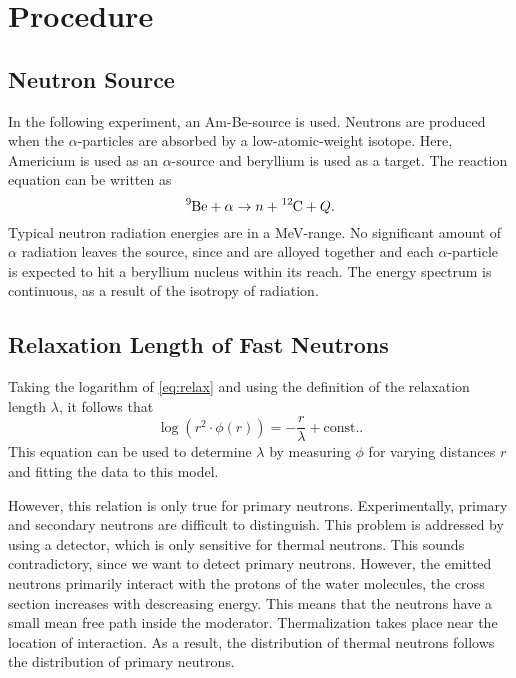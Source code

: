 \chapter{Procedure}\label{chap:explaining-shit}
\section{Neutron Source}
In the following experiment, an Am-Be-source is used.
Neutrons are produced when the $\alpha$-particles are absorbed by a low-atomic-weight isotope.
Here, Americium is used as an $\alpha$-source and beryllium is used as a target.
The reaction equation can be written as
\begin{equation*}
	\ce{^{9}Be} + \alpha \rightarrow n + \ce{^{12}C} + Q.
\end{equation*}
Typical neutron radiation energies are in a \si{MeV}-range.
No significant amount of $\alpha$ radiation leaves the source, since  and  are alloyed together and each $\alpha$-particle is expected to hit a beryllium nucleus within its reach.
The energy spectrum is continuous, as a result of the isotropy of radiation.

\section{Relaxation Length of Fast Neutrons}\label{sec:relaxa}
Taking the logarithm of \autoref{eq:relax} and using the definition of the relaxation length $\lambda$, it follows that
\begin{equation*}
	\log(r^2\cdot\phi(r)) = -\frac{r}{\lambda} + \text{const.}.
\end{equation*}
This equation can be used to determine $\lambda$ by measuring $\phi$ for varying distances $r$ and fitting the data to this model.

However, this relation is only true for primary neutrons.
Experimentally, primary and secondary neutrons are difficult to distinguish.
This problem is addressed by using a  detector, which is only sensitive for thermal neutrons.
This sounds contradictory, since we want to detect primary neutrons.
However, the emitted neutrons primarily interact with the protons of the water molecules, the cross section increases with descreasing energy.
This means that the neutrons have a small mean free path inside the moderator.
Thermalization takes place near the location of interaction.
As a result, the distribution of thermal neutrons follows the distribution of primary neutrons.

